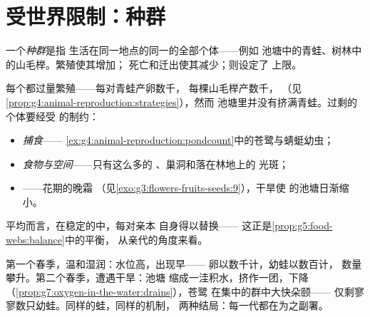 \section{受世界限制：种群}

\begin{definition}[种群]\label{def:g8:reproduction-and-environment:population}
一个\emph{种群}是指
生活在同一地点的同一的全部个体——例如
池塘中的青蛙、树林中的山毛榉。繁殖使其增加；
死亡和迁出使其减少；则设定了
上限。
\end{definition}

\begin{proposition}[种群为何不会爆发式增长]\label{prop:g8:reproduction-and-environment:limits}
每个都过量繁殖——每对青蛙产卵数千，
每棵山毛榉产数千，
（见\cref{prop:g4:animal-reproduction:strategies}），然而
池塘里并没有挤满青蛙。过剩的个体要经受
的制约：
\begin{itemize}
  \item \emph{捕食}——
        \cref{ex:g4:animal-reproduction:pondcount}中的苍鹭与蜻蜓幼虫；
  \item \emph{食物与空间}——只有这么多的
        、巢洞和落在林地上的
        光斑；
  \item \emph{}——花期的晚霜
        （见\cref{exo:g3:flowers-fruits-seeds:9}），干旱使
        的池塘日渐缩小。
\end{itemize}
平均而言，在稳定的中，每对亲本
自身得以替换——
这正是\cref{prop:g5:food-webs:balance}中的平衡，
从亲代的角度来看。
\end{proposition}
\admitted

\begin{example}[池塘边的两个春季]\label{ex:g8:reproduction-and-environment:twosprings}
第一个春季，温和湿润：水位高，出现早——
卵以数千计，幼蛙以数百计，
数量攀升。第二个春季，遭遇干旱：池塘
缩成一洼积水，挤作一团，下降
（\cref{prop:g7:oxygen-in-the-water:drains}），苍鹭
在集中的群中大快朵颐——
仅剩寥寥数只幼蛙。同样的蛙，同样的机制，
两种结局：每一代都在为之副署。
\end{example}

